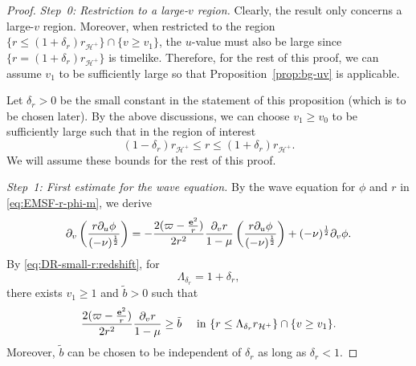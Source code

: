 \documentclass[10pt, reqno]{amsart}
\theoremstyle{definition}
\theoremstyle{remark}
\theoremstyle{conjecture}
\numberwithin{equation}{section}
\newcommand{\rd}{\partial}
\newcommand{\0}{\emptyset}
\newcommand{\bfe}{{\bf e}}
\newcommand{\calH}{\mathcal H}
\newcommand{\f}{\frac}
\newcommand{\de}{\delta}
\newcommand{\EH}{\calH^{+}}
\newcommand{\pfstep}[1]{\vspace{.5em} {\it \noindent #1.}}
\newcommand{\e}{\bfe}							%
\begin{document}
\begin{proof}
\pfstep{Step~0: Restriction to a large-$v$ region}
Clearly, the result only concerns a large-$v$ region. Moreover, when restricted to the region $\{r\leq (1+\de_r) r_{\EH}\}\cap \{v\geq v_1\}$, the $u$-value must also be large since $\{r=(1+\de_r) r_{\EH}\}$ is timelike. Therefore, for the rest of this proof, we can assume $v_1$ to be sufficiently large so that Proposition~\ref{prop:bg-uv} is applicable.

Let $\de_r>0$ be the small constant in the statement of this proposition (which is to be chosen later). By the above discussions, we can choose $v_1\geq v_0$ to be sufficiently large such that in the region of interest%
\begin{equation}\label{red.shift.r.bounds}
(1-\de_r)r_{\EH}\leq r \leq (1+\de_r)r_{\EH}.
\end{equation}
We will assume these bounds for the rest of this proof.

\pfstep{Step~1: First estimate for the wave equation}
By the wave equation for $\phi$ and $r$ in \eqref{eq:EMSF-r-phi-m}, we derive
$$\rd_v\left(\f{r\rd_u\phi}{(-\nu)^{\f 12}}\right)=-\f{2 (\varpi-\f{\e^2}{r})}{2 r^2}\f{\rd_v r}{1-\mu}\left(\f{r\rd_u\phi}{(-\nu)^{\f 12}}\right)+(-\nu)^{\f 12}\rd_v\phi.$$
By \eqref{eq:DR-small-r:redshift}, for 
$$\Lambda_{\de_r}=1+\de_r,$$ there exists $v_1\geq 1$ and $\tilde{b}>0$ such that
$$\f{2 (\varpi-\f{\e^2}{r})}{2r^2}\f{\rd_v r}{1-\mu}\geq \tilde{b}\quad \mbox{ in }\{r\leq \Lambda_{\de_r} r_{\EH}\}\cap\{v\geq v_1\}.$$
Moreover, $\tilde{b}$ can be chosen to be independent of ${\de_r}$ as long as ${\de_r}<1$.


\end{proof}
\end{document}
